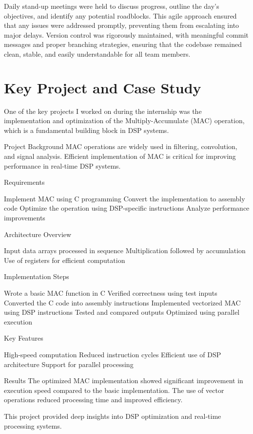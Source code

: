 \documentclass[12pt,a4paper]{report}
\begin{document}
Daily stand-up meetings were held to discuss progress, outline the day's objectives, and identify any potential roadblocks. This agile approach ensured that any issues were addressed promptly, preventing them from escalating into major delays. Version control was rigorously maintained, with meaningful commit messages and proper branching strategies, ensuring that the codebase remained clean, stable, and easily understandable for all team members.


\section{Key Project and Case Study}

One of the key projects I worked on during the internship was the implementation and optimization of the Multiply-Accumulate (MAC) operation, which is a fundamental building block in DSP systems.


Project Background MAC operations are widely used in filtering, convolution, and signal analysis. Efficient implementation of MAC is critical for improving performance in real-time DSP systems.


Requirements


Implement MAC using C programming Convert the implementation to assembly code Optimize the operation using DSP-specific instructions Analyze performance improvements


Architecture Overview


Input data arrays processed in sequence Multiplication followed by accumulation Use of registers for efficient computation


Implementation Steps


Wrote a basic MAC function in C Verified correctness using test inputs Converted the C code into assembly instructions Implemented vectorized MAC using DSP instructions Tested and compared outputs Optimized using parallel execution


Key Features


High-speed computation Reduced instruction cycles Efficient use of DSP architecture Support for parallel processing


Results The optimized MAC implementation showed significant improvement in execution speed compared to the basic implementation. The use of vector operations reduced processing time and improved efficiency.


This project provided deep insights into DSP optimization and real-time processing systems.
\end{document}
